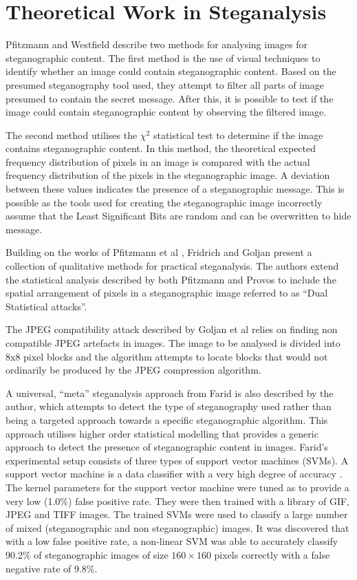 \documentclass[12pt]{extreport}
\begin{document}
\section{Theoretical Work in Steganalysis}
\label{sec:theory}
Pfitzmann and Westfield \cite{westfeld2000attacks} describe two methods for analysing images for steganographic content. The first method is the use of visual techniques to identify whether an image could contain steganographic content. Based on the presumed  steganography tool used, they attempt to filter all parts of image presumed to contain the secret message. 
After this, it is possible to test if the image could contain steganographic content by observing the filtered image.  
\par The second method utilises the $\chi^{2}$ statistical test to determine if the image contains steganographic content. In this method,  the theoretical expected frequency distribution of pixels in an image is compared with the actual frequency distribution of the pixels in the steganographic image. A deviation between these values indicates the presence of a steganographic message. This is possible as the tools used for creating the steganographic image incorrectly assume that the Least Significant Bits are random and can be overwritten to hide message.
\par Building on the works of Pfitzmann et al  \cite{westfeld2000attacks}, Fridrich and Goljan \cite{fridrich2002practical} present a collection of qualitative methods for practical steganalysis. The authors extend the statistical analysis described by both Pfitzmann and Provos to include the spatial arrangement of pixels in a steganographic image referred to as ``Dual Statistical attacks''. 
\par The JPEG compatibility attack described by Goljan et al relies on finding non compatible JPEG artefacts in images. The image to be analysed is divided into  8x8 pixel blocks and the algorithm attempts to locate blocks that would not ordinarily be produced by the JPEG compression algorithm.
\par A universal, ``meta'' steganalysis approach from Farid  \cite{farid2002detecting} is also described by the author, which attempts to detect the type of steganography used rather than being a targeted approach towards a specific steganographic algorithm.  This approach utilises higher order statistical modelling that provides a generic approach to detect the presence of steganographic content in images. Farid's experimental setup consists of three types of support vector machines (SVMs). A support vector machine is a data classifier with a very high degree of accuracy \cite{noble2006support}. The kernel parameters for the support vector machine were tuned as to provide a very low (1.0\%) false positive rate. They were then trained with a library of GIF, JPEG and TIFF images. The trained SVMs were used to classify a large number of mixed (steganographic and non steganographic) images. It was discovered that with a low false positive rate, a non-linear SVM was able to accurately classify 90.2\% of steganographic images of size $160\times160$ pixels correctly with a false negative rate of 9.8\%.
\end{document}
